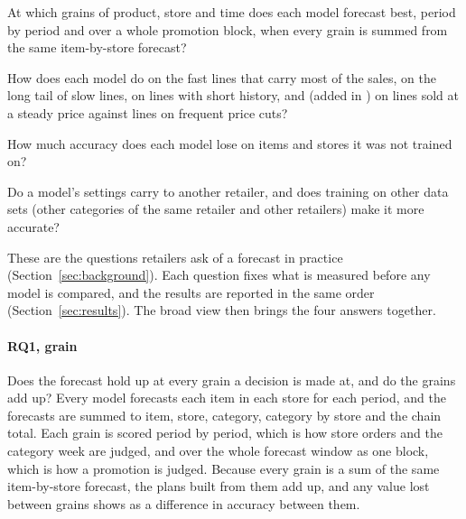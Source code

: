 \begin{description}\setlength{\itemsep}{2pt}
\item[RQ1, grain.] At which grains of product, store and time does each model
  forecast best, period by period and over a whole promotion block, when every
  grain is summed from the same item-by-store forecast?
\item[RQ2, nature of the line.] How does each model do on the fast lines that
  carry most of the sales, on the long tail of slow lines, on lines with
  short history, and (added in \thisrev{}) on lines sold at a steady price
  against lines on frequent price cuts?
\item[RQ3, seen and unseen data.] How much accuracy does each model lose on
  items and stores it was not trained on?
\item[RQ4, transferability.] Do a model's settings carry to another retailer,
  and does training on other data sets (other categories of the same retailer and other retailers) make it more accurate?
\end{description}

\noindent These are the questions retailers ask of a forecast in practice\ifjournal\else{}
(Section~\ref{sec:background})\fi. Each question fixes what is measured before any
model is compared,
and the results are reported in the same order (Section~\ref{sec:results}).
The broad view then brings the four answers together.

\paragraph{RQ1, grain} Does the forecast hold up at every grain a decision is made
at, and do the grains add up? Every model forecasts each item in each store for
each period, and the forecasts are summed to item, store, category, category by
store and the chain total. Each grain is scored period by period, which is how
store orders and the category week are judged, and over the whole forecast
window as one block, which is how a promotion is judged. Because every grain is
a sum of the same item-by-store forecast, the plans built from them add up, and
any value lost between grains shows as a difference in accuracy between them.

